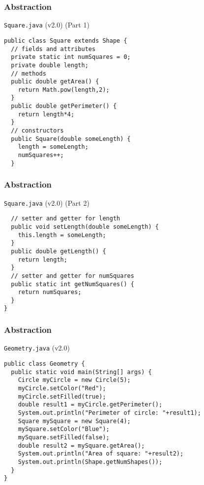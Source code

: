 \documentclass[10pt, compress]{beamer}
\begin{document}
\begin{frame}[fragile]
  \frametitle{Abstraction}
  \begin{block}{\texttt{Square.java} (v2.0) (Part 1)}
    \begin{verbatim}
public class Square extends Shape {
  // fields and attributes
  private static int numSquares = 0;
  private double length;
  // methods
  public double getArea() {
    return Math.pow(length,2);
  }
  public double getPerimeter() {
    return length*4;
  }
  // constructors
  public Square(double someLength) {
    length = someLength;
    numSquares++;
  }
    \end{verbatim}
  \end{block}
\end{frame}

\begin{frame}[fragile]
  \frametitle{Abstraction}
  \begin{block}{\texttt{Square.java} (v2.0) (Part 2)}
    \begin{verbatim}
  // setter and getter for length
  public void setLength(double someLength) {
    this.length = someLength;
  }
  public double getLength() {
    return length;
  }
  // setter and getter for numSquares
  public static int getNumSquares() {
    return numSquares;
  }
}
    \end{verbatim}
  \end{block}
\end{frame}

\begin{frame}[fragile]
  \frametitle{Abstraction}
  \begin{block}{\texttt{Geometry.java} (v2.0)}
    \begin{verbatim}
public class Geometry {
  public static void main(String[] args) {
    Circle myCircle = new Circle(5);
    myCircle.setColor("Red");
    myCircle.setFilled(true);
    double result1 = myCircle.getPerimeter();
    System.out.println("Perimeter of circle: "+result1);
    Square mySquare = new Square(4);
    mySquare.setColor("Blue");
    mySquare.setFilled(false);
    double result2 = mySquare.getArea();
    System.out.println("Area of square: "+result2);
    System.out.println(Shape.getNumShapes());
  }
}
    \end{verbatim}
  \end{block}
\end{frame}
\end{document}
